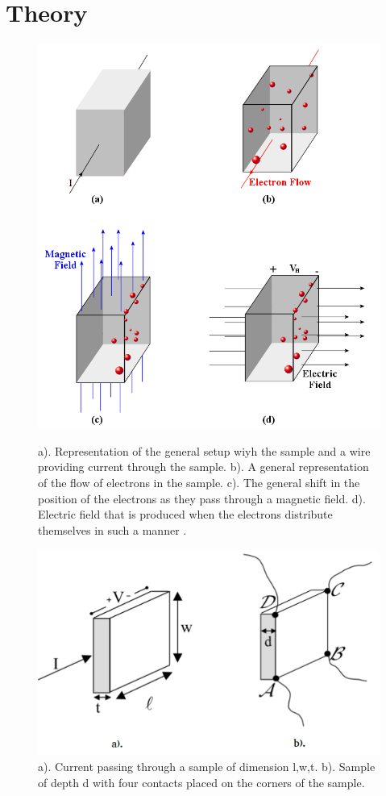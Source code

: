 \documentclass[twocolumn]{article}
\begin{document}
\section{Theory}
\begin{figure}
\begin{minipage}[t]{0.46\textwidth}
\includegraphics[width=\linewidth,height=\linewidth]{shift-electrons.png}
\caption{a). Representation of the general setup wiyh the sample and a wire 
providing current through the sample. b). A general representation of the flow 
of electrons in the sample. c). The general shift in the position of the 
electrons as they pass through a magnetic field. d). Electric field that is 
produced when the electrons distribute themselves in such a manner 
\cite{ref:2}.}
\label{fig:1}
\end{minipage}
\hfill
\begin{minipage}[t]{0.46\textwidth}
\includegraphics[width=\linewidth]{contacts-dim.png}
\caption{a). Current passing through a sample of dimension l,w,t. b). Sample of
depth d with four contacts placed on the corners of the sample.}
\label{fig:2}
\end{minipage}
\end{figure}
\end{document}

